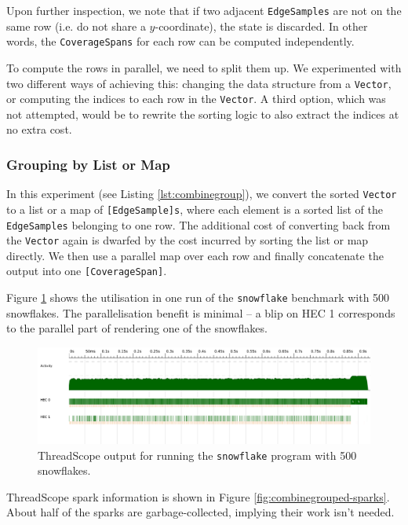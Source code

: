 \documentclass[12pt, a4paper]{article}
\begin{document}
Upon further inspection, we note that if two adjacent \texttt{EdgeSamples} are not on the same row (i.e. do not share a $y$-coordinate), the state is discarded. In other words, the \texttt{CoverageSpans} for each row can be computed independently.

To compute the rows in parallel, we need to split them up. We experimented with two different ways of achieving this: changing the data structure from a \texttt{Vector}, or computing the indices to each row in the \texttt{Vector}. A third option, which was not attempted,  would be to rewrite the sorting logic to also extract the indices at no extra cost.

\subsubsection{Grouping by List or Map}

In this experiment (see Listing \ref{lst:combinegroup}), we convert the sorted \texttt{Vector} to a list or a map of \texttt{[EdgeSample]s}, where each element is a sorted list of the \texttt{EdgeSamples} belonging to one row. The additional cost of converting back from the \texttt{Vector} again is dwarfed by the cost incurred by sorting the list or map directly. We then use a parallel map over each row and finally concatenate the output into one \texttt{[CoverageSpan]}.

Figure \ref{fig:combinegrouped} shows the utilisation in one run of the \texttt{snowflake} benchmark with 500 snowflakes. The parallelisation benefit is minimal -- a blip on HEC 1 corresponds to the parallel part of rendering one of the snowflakes.

 \begin{figure}[H]
  \centering
  \includegraphics[width=\linewidth]{../threadscope/combinegrouped/bigflake}
  \caption{ThreadScope output for running the \texttt{snowflake} program with 500 snowflakes.}
  \label{fig:combinegrouped}
\end{figure}

ThreadScope spark information is shown in Figure \ref{fig:combinegrouped-sparks}. About half of the sparks are garbage-collected, implying their work isn't needed.
\end{document}
